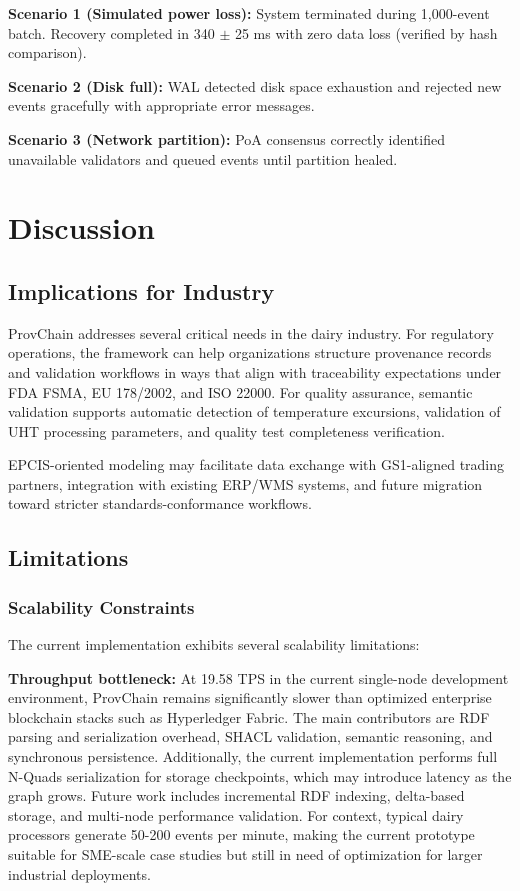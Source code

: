 \documentclass[preprint,review,12pt,authoryear]{elsarticle}
\begin{document}
\textbf{Scenario 1 (Simulated power loss):} System terminated during 1,000-event batch. Recovery completed in 340 $\pm$ 25 ms with zero data loss (verified by hash comparison).

\textbf{Scenario 2 (Disk full):} WAL detected disk space exhaustion and rejected new events gracefully with appropriate error messages.

\textbf{Scenario 3 (Network partition):} PoA consensus correctly identified unavailable validators and queued events until partition healed.

\section{Discussion}\label{sec:discussion}

\subsection{Implications for Industry}

ProvChain addresses several critical needs in the dairy industry. For regulatory operations, the framework can help organizations structure provenance records and validation workflows in ways that align with traceability expectations under FDA FSMA, EU 178/2002, and ISO 22000. For quality assurance, semantic validation supports automatic detection of temperature excursions, validation of UHT processing parameters, and quality test completeness verification.

EPCIS-oriented modeling may facilitate data exchange with GS1-aligned trading partners, integration with existing ERP/WMS systems, and future migration toward stricter standards-conformance workflows.

\subsection{Limitations}

\subsubsection{Scalability Constraints}

The current implementation exhibits several scalability limitations:

\textbf{Throughput bottleneck:} At 19.58 TPS in the current single-node development environment, ProvChain remains significantly slower than optimized enterprise blockchain stacks such as Hyperledger Fabric. The main contributors are RDF parsing and serialization overhead, SHACL validation, semantic reasoning, and synchronous persistence. Additionally, the current implementation performs full N-Quads serialization for storage checkpoints, which may introduce latency as the graph grows. Future work includes incremental RDF indexing, delta-based storage, and multi-node performance validation. For context, typical dairy processors generate 50-200 events per minute, making the current prototype suitable for SME-scale case studies but still in need of optimization for larger industrial deployments.
\end{document}
